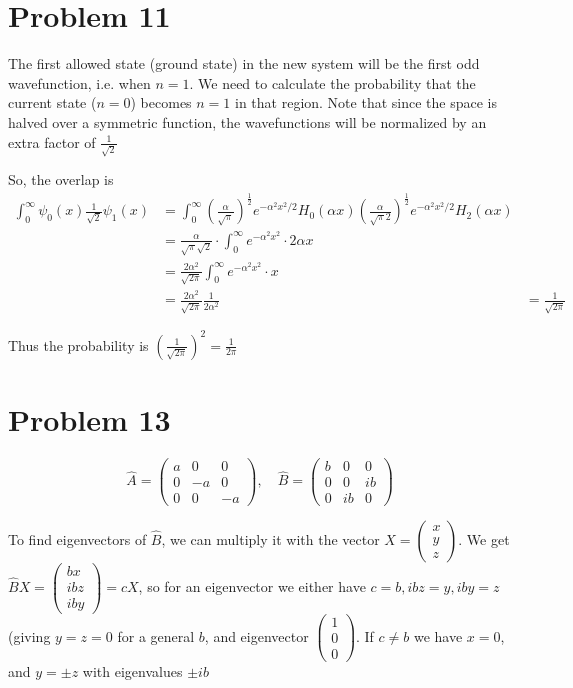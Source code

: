 \documentclass[12pt]{article}
\begin{document}
\section*{Problem 11}
The first allowed state (ground state) in the new system will be the first odd wavefunction, i.e. when $n=1$. We need to calculate the probability that the current state ($n=0$) becomes $n=1$ in that region. Note that since the space is halved over a symmetric function, the wavefunctions will be normalized by an extra factor of $\frac1{\sqrt2}$

So, the overlap is 
\begin{align*}
\int_0^\infty \psi_0(x)\frac1{\sqrt2}\psi_1(x)
&= \int_0^\infty  \left(\frac{\alpha}{\sqrt{\pi}}\right)^{\frac12}e^{-\alpha^2x^2/2}H_0(\alpha x)\left(\frac{\alpha}{\sqrt{\pi}2}\right)^\frac12 e^{-\alpha^2x^2/2}H_2(\alpha x)\\
&= \frac{\alpha}{\sqrt\pi\sqrt2}\cdot \int_0^\infty e^{-\alpha^2x^2}\cdot 2\alpha x\\
&=\frac{2\alpha^2}{\sqrt{2\pi}} \int_0^\infty e^{-\alpha^2x^2}\cdot  x\\
&=\frac{2\alpha^2}{\sqrt{2\pi}}\frac{1}{2\alpha^2}
&=\frac{1}{\sqrt{2\pi}}
\end{align*}

Thus the probability is $\left(\frac1{\sqrt{2\pi}}\right)^2=\boxed{\frac{1}{2\pi}}$

\section*{Problem 13}
$$\hat{A}=\begin{pmatrix}a&0&0\\0&-a&0\\0&0&-a\end{pmatrix},\quad\hat{B}=\begin{pmatrix}b&0&0\\0&0&ib\\0&ib&0\end{pmatrix}$$

To find eigenvectors of $\hat B$, we can multiply it with the vector $X=\begin{pmatrix}x\\y\\z\end{pmatrix}$. We get $\hat BX=\begin{pmatrix}bx\\ibz\\iby\end{pmatrix}=cX$, so for an eigenvector we either have $c=b,ibz=y,iby=z$ (giving $y=z=0$ for a general $b$, and eigenvector $\begin{pmatrix}1\\0\\0\end{pmatrix}$. If $c\neq b$ we have $x=0$, and $y=\pm z$ with eigenvalues $\pm ib$
\end{document}
